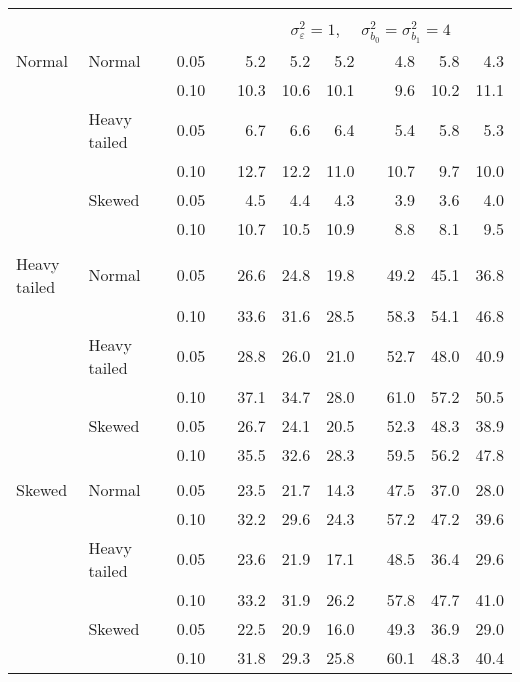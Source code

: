 \begin{table}[ht]
\begin{scriptsize}
\begin{center}
\begin{tabular}{ll p{.1cm} c p{.1cm} rrr p{.1cm} rrr}
&&&&&&&&&&&\\
& && && \multicolumn{7}{c}{$\sigma_{\varepsilon}^2 = 1$, \ \ $\sigma_{b_0}^2 = \sigma_{b_1}^2 = 4$} \\ \cline{6-12}
\rowcolor{gray!20}Normal       & Normal       && 0.05 &&   5.2 & 5.2 & 5.2 &   & 4.8 & 5.8 & 4.3 \\ 
\rowcolor{gray!20}             &              && 0.10 &&   10.3 & 10.6 & 10.1 &   & 9.6 & 10.2 & 11.1 \\ 
\rowcolor{gray!20}             & Heavy tailed && 0.05 &&   6.7 & 6.6 & 6.4 &   & 5.4 & 5.8 & 5.3 \\ 
\rowcolor{gray!20}             &              && 0.10 &&   12.7 & 12.2 & 11.0 &   & 10.7 & 9.7 & 10.0 \\ 
\rowcolor{gray!20}             & Skewed       && 0.05 &&   4.5 & 4.4 & 4.3 &   & 3.9 & 3.6 & 4.0 \\ 
\rowcolor{gray!20}             &              && 0.10 &&   10.7 & 10.5 & 10.9 &   & 8.8 & 8.1 & 9.5 \\ 
&&&&&&&&&&&\\
Heavy tailed & Normal       && 0.05 &&   26.6 & 24.8 & 19.8 &   & 49.2 & 45.1 & 36.8 \\ 
             &              && 0.10 &&   33.6 & 31.6 & 28.5 &   & 58.3 & 54.1 & 46.8 \\ 
             & Heavy tailed && 0.05 &&   28.8 & 26.0 & 21.0 &   & 52.7 & 48.0 & 40.9 \\ 
             &              && 0.10 &&   37.1 & 34.7 & 28.0 &   & 61.0 & 57.2 & 50.5 \\ 
             & Skewed       && 0.05 &&   26.7 & 24.1 & 20.5 &   & 52.3 & 48.3 & 38.9 \\ 
             &              && 0.10 &&   35.5 & 32.6 & 28.3 &   & 59.5 & 56.2 & 47.8 \\ 
&&&&&&&&&&&\\
Skewed       & Normal       && 0.05 &&   23.5 & 21.7 & 14.3 &   & 47.5 & 37.0 & 28.0 \\ 
             &              && 0.10 &&   32.2 & 29.6 & 24.3 &   & 57.2 & 47.2 & 39.6 \\ 
             & Heavy tailed && 0.05 &&   23.6 & 21.9 & 17.1 &   & 48.5 & 36.4 & 29.6 \\ 
             &              && 0.10 &&   33.2 & 31.9 & 26.2 &   & 57.8 & 47.7 & 41.0 \\ 
             & Skewed       && 0.05 &&   22.5 & 20.9 & 16.0 &   & 49.3 & 36.9 & 29.0 \\ 
             &              && 0.10 &&   31.8 & 29.3 & 25.8 &   & 60.1 & 48.3 & 40.4 \\ 

\hline
\end{tabular}
\end{center}
\end{scriptsize}
\end{table}

